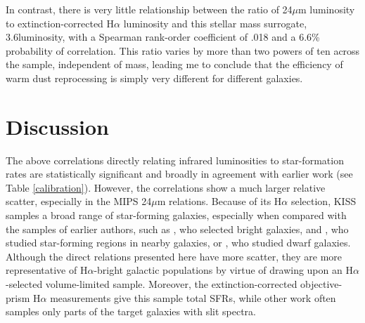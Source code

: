 In contrast, there is very little relationship between the ratio of 24$\mu$m luminosity to extinction-corrected H$\alpha$ luminosity and this stellar mass surrogate, 3.6\micron luminosity, with a Spearman rank-order coefficient of .018 and a 6.6\% probability of correlation. This ratio varies by more than two powers of ten across the sample, independent of mass, leading me to conclude that the efficiency of warm dust reprocessing is simply very different for different galaxies.




\section{Discussion}
\label{sec:kissdiscuss}

The above correlations directly relating infrared luminosities to star-formation rates are statistically significant and broadly in agreement with earlier work \citep{Rosenberg,Calzetti2007,Wu,AlonsoHerrero,PerezGonzalez} (see Table \ref{calibration}). However, the correlations show a much larger relative scatter, especially in the MIPS 24$\mu$m relations. Because of its H$\alpha$ selection, KISS samples a broad range of star-forming galaxies, especially when compared with the samples of earlier authors, such as \cite{Wu}, who selected bright galaxies, \cite{Calzetti2005} and \cite{PerezGonzalez}, who studied star-forming regions in nearby galaxies, or \cite{Rosenberg}, who studied dwarf galaxies. Although the direct relations presented here have more scatter, they are more representative of H$\alpha$-bright galactic populations by virtue of drawing upon an H$\alpha$-selected volume-limited sample. Moreover, the extinction-corrected objective-prism H$\alpha$ measurements give this sample total SFRs, while other work often samples only parts of the target galaxies with slit spectra.

